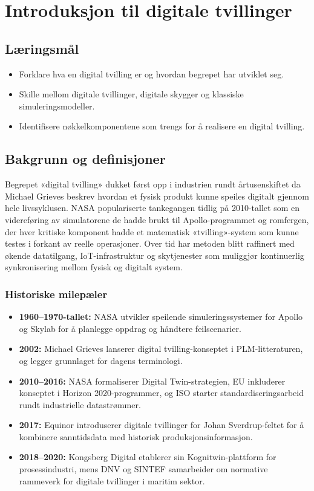 \chapter{Introduksjon til digitale tvillinger}

\section{Læringsmål}
\begin{itemize}
    \item Forklare hva en digital tvilling er og hvordan begrepet har utviklet seg.
    \item Skille mellom digitale tvillinger, digitale skygger og klassiske simuleringsmodeller.
    \item Identifisere nøkkelkomponentene som trengs for å realisere en digital tvilling.
\end{itemize}

\section{Bakgrunn og definisjoner}
Begrepet «digital tvilling» dukket først opp i industrien rundt årtusenskiftet da Michael Grieves beskrev hvordan et fysisk produkt kunne speiles digitalt gjennom hele livssyklusen. NASA populariserte tankegangen tidlig på 2010-tallet som en videreføring av simulatorene de hadde brukt til Apollo-programmet og romfergen, der hver kritiske komponent hadde et matematisk «tvilling»-system som kunne testes i forkant av reelle operasjoner. Over tid har metoden blitt raffinert med økende datatilgang, IoT-infrastruktur og skytjenester som muliggjør kontinuerlig synkronisering mellom fysisk og digitalt system.

\subsection{Historiske milepæler}
\begin{itemize}
    \item \textbf{1960--1970-tallet:} NASA utvikler speilende simuleringssystemer for Apollo og Skylab for å planlegge oppdrag og håndtere feilscenarier.
    \item \textbf{2002:} Michael Grieves lanserer digital tvilling-konseptet i PLM-litteraturen, og legger grunnlaget for dagens terminologi.
    \item \textbf{2010--2016:} NASA formaliserer Digital Twin-strategien, EU inkluderer konseptet i Horizon 2020-programmer, og ISO starter standardiseringsarbeid rundt industrielle datastrømmer.
    \item \textbf{2017:} Equinor introduserer digitale tvillinger for Johan Sverdrup-feltet for å kombinere sanntidsdata med historisk produksjonsinformasjon.
    \item \textbf{2018--2020:} Kongsberg Digital etablerer sin Kognitwin-plattform for prosessindustri, mens DNV og SINTEF samarbeider om normative rammeverk for digitale tvillinger i maritim sektor.
\end{itemize}

